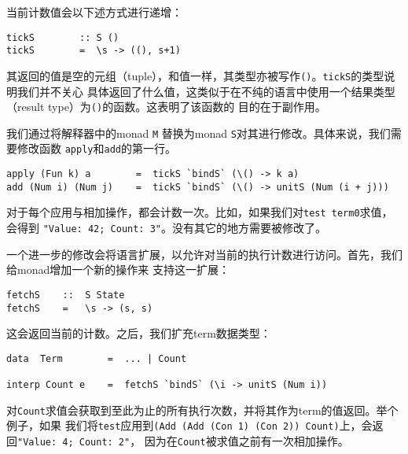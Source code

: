 \documentclass[12pt]{article}
\begin{document}
\indent{}当前计数值会以下述方式进行递增：
\begin{verbatim}
tickS        :: S ()
tickS        =  \s -> ((), s+1)
\end{verbatim}
\noindent{}其返回的值是空的元组（tuple），和值一样，其类型亦被写作\texttt{()}。\texttt{tickS}的类型说明我们并不关心
具体返回了什么值，这类似于在不纯的语言中使用一个结果类型（result type）为\texttt{()}的函数。这表明了该函数的
目的在于副作用。

\indent{}我们通过将解释器中的monad \texttt{M} 替换为monad \texttt{S}对其进行修改。具体来说，我们需要修改函数
\texttt{apply}和\texttt{add}的第一行。
\begin{verbatim}
apply (Fun k) a        =  tickS `bindS` (\() -> k a)
add (Num i) (Num j)    =  tickS `bindS` (\() -> unitS (Num (i + j)))
\end{verbatim}
\noindent{}对于每个应用与相加操作，都会计数一次。比如，如果我们对\texttt{test term0}求值，会得到
\texttt{"Value: 42; Count: 3"}。没有其它的地方需要被修改了。

\indent{}一个进一步的修改会将语言扩展，以允许对当前的执行计数进行访问。首先，我们给monad增加一个新的操作来
支持这一扩展：
\begin{verbatim}
fetchS    ::  S State
fetchS    =   \s -> (s, s)
\end{verbatim}
\noindent{}这会返回当前的计数。之后，我们扩充term数据类型：
\begin{verbatim}
data  Term        =  ... | Count

interp Count e    =  fetchS `bindS` (\i -> unitS (Num i))
\end{verbatim}
\noindent{}对\texttt{Count}求值会获取到至此为止的所有执行次数，并将其作为term的值返回。举个例子，如果
我们将\texttt{test}应用到\texttt{(Add (Add (Con 1) (Con 2)) Count)}上，会返回\texttt{"Value: 4; Count: 2"}，
因为在\texttt{Count}被求值之前有一次相加操作。
\end{document}
